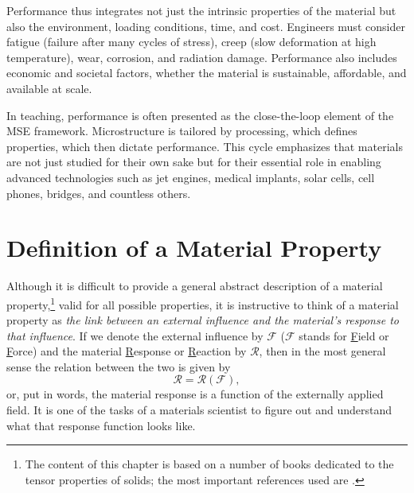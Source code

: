 Performance thus integrates not just the intrinsic properties of the material but also the environment, loading conditions, time, and cost. Engineers must consider fatigue (failure after many cycles of stress), creep (slow deformation at high temperature), wear, corrosion, and radiation damage. Performance also includes economic and societal factors, whether the material is sustainable, affordable, and available at scale.

In teaching, performance is often presented as the close-the-loop element of the MSE framework. Microstructure is tailored by processing, which defines properties, which then dictate performance. This cycle emphasizes that materials are not just studied for their own sake but for their essential role in enabling advanced technologies such as jet engines, medical implants, solar cells, cell phones, bridges, and countless others.


\section{Definition of a Material Property}\label{\chabbr:sec:matprop}


Although it is difficult to provide a general abstract description of a material property,\footnote{The content of this chapter is based on a number of books dedicated to the tensor properties of solids; the most important references used are \cite{kiral1990a,nowick1995a,white1999a,newnham2004a,tinder2007a}.} valid for all possible properties, it is instructive to think of a material property as \textit{the link between an external influence and the material's response to that influence}.  If we denote the external influence by $\mathcal{F}$ ($\mathcal{F}$ stands for \underline{F}ield or \underline{F}orce) and the material \underline{R}esponse or \underline{R}eaction by $\mathcal{R}$, then in the most general sense the relation between the two is given by
\begin{equation}
	\mathcal{R}=\mathcal{R}(\mathcal{F}),\label{\chabbr:eq:rf}
\end{equation}
or, put in words, the material response is a function of the externally applied field.  It is one of the tasks of a materials scientist to figure out and understand what that response function looks like.

